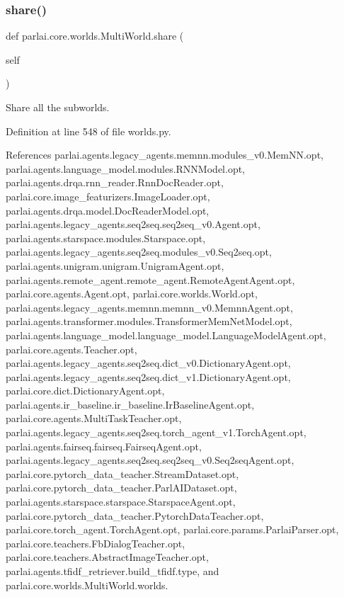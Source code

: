 \subsubsection{\texorpdfstring{share()}{share()}}
{\footnotesize\ttfamily def parlai.\+core.\+worlds.\+Multi\+World.\+share (\begin{DoxyParamCaption}\item[{}]{self }\end{DoxyParamCaption})}

\begin{DoxyVerb}Share all the subworlds.\end{DoxyVerb}
 

Definition at line 548 of file worlds.\+py.



References parlai.\+agents.\+legacy\+\_\+agents.\+memnn.\+modules\+\_\+v0.\+Mem\+N\+N.\+opt, parlai.\+agents.\+language\+\_\+model.\+modules.\+R\+N\+N\+Model.\+opt, parlai.\+agents.\+drqa.\+rnn\+\_\+reader.\+Rnn\+Doc\+Reader.\+opt, parlai.\+core.\+image\+\_\+featurizers.\+Image\+Loader.\+opt, parlai.\+agents.\+drqa.\+model.\+Doc\+Reader\+Model.\+opt, parlai.\+agents.\+legacy\+\_\+agents.\+seq2seq.\+seq2seq\+\_\+v0.\+Agent.\+opt, parlai.\+agents.\+starspace.\+modules.\+Starspace.\+opt, parlai.\+agents.\+legacy\+\_\+agents.\+seq2seq.\+modules\+\_\+v0.\+Seq2seq.\+opt, parlai.\+agents.\+unigram.\+unigram.\+Unigram\+Agent.\+opt, parlai.\+agents.\+remote\+\_\+agent.\+remote\+\_\+agent.\+Remote\+Agent\+Agent.\+opt, parlai.\+core.\+agents.\+Agent.\+opt, parlai.\+core.\+worlds.\+World.\+opt, parlai.\+agents.\+legacy\+\_\+agents.\+memnn.\+memnn\+\_\+v0.\+Memnn\+Agent.\+opt, parlai.\+agents.\+transformer.\+modules.\+Transformer\+Mem\+Net\+Model.\+opt, parlai.\+agents.\+language\+\_\+model.\+language\+\_\+model.\+Language\+Model\+Agent.\+opt, parlai.\+core.\+agents.\+Teacher.\+opt, parlai.\+agents.\+legacy\+\_\+agents.\+seq2seq.\+dict\+\_\+v0.\+Dictionary\+Agent.\+opt, parlai.\+agents.\+legacy\+\_\+agents.\+seq2seq.\+dict\+\_\+v1.\+Dictionary\+Agent.\+opt, parlai.\+core.\+dict.\+Dictionary\+Agent.\+opt, parlai.\+agents.\+ir\+\_\+baseline.\+ir\+\_\+baseline.\+Ir\+Baseline\+Agent.\+opt, parlai.\+core.\+agents.\+Multi\+Task\+Teacher.\+opt, parlai.\+agents.\+legacy\+\_\+agents.\+seq2seq.\+torch\+\_\+agent\+\_\+v1.\+Torch\+Agent.\+opt, parlai.\+agents.\+fairseq.\+fairseq.\+Fairseq\+Agent.\+opt, parlai.\+agents.\+legacy\+\_\+agents.\+seq2seq.\+seq2seq\+\_\+v0.\+Seq2seq\+Agent.\+opt, parlai.\+core.\+pytorch\+\_\+data\+\_\+teacher.\+Stream\+Dataset.\+opt, parlai.\+core.\+pytorch\+\_\+data\+\_\+teacher.\+Parl\+A\+I\+Dataset.\+opt, parlai.\+agents.\+starspace.\+starspace.\+Starspace\+Agent.\+opt, parlai.\+core.\+pytorch\+\_\+data\+\_\+teacher.\+Pytorch\+Data\+Teacher.\+opt, parlai.\+core.\+torch\+\_\+agent.\+Torch\+Agent.\+opt, parlai.\+core.\+params.\+Parlai\+Parser.\+opt, parlai.\+core.\+teachers.\+Fb\+Dialog\+Teacher.\+opt, parlai.\+core.\+teachers.\+Abstract\+Image\+Teacher.\+opt, parlai.\+agents.\+tfidf\+\_\+retriever.\+build\+\_\+tfidf.\+type, and parlai.\+core.\+worlds.\+Multi\+World.\+worlds.




